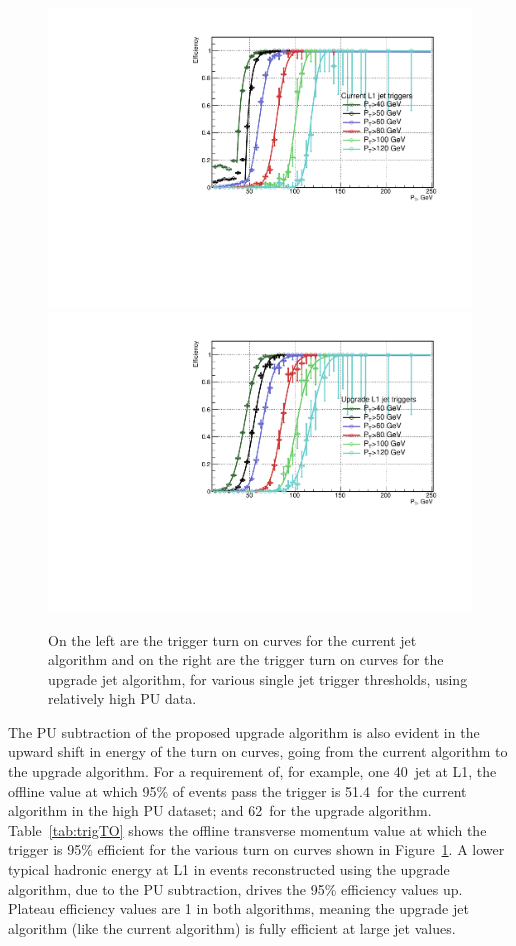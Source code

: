 \begin{figure}[t!]
\begin{center}
  \includegraphics[scale=0.37]{Figures/l1jets//CurrentL1JetTriggersHPU.pdf}
    \includegraphics[scale=0.37]{Figures/l1jets//UpgradeL1JetTriggersHPU.pdf}
\caption{On the left are the trigger turn on curves for the current jet algorithm and on the right are the trigger turn on curves for the upgrade jet algorithm, for various single jet trigger thresholds, using relatively high \ac{PU} data.}
\label{JetTO_highPU}
\end{center}
\end{figure}

The \ac{PU} subtraction of the proposed upgrade algorithm is also evident in the upward shift in energy of the turn on curves, going from the current algorithm to the upgrade algorithm. 
For a requirement of, for example, one 40~\GeV jet at \ac{L1}, the offline value at which 95\% of events pass the 
trigger is 51.4~\GeV for the current algorithm in the high \ac{PU} dataset; and 62~\GeV for the upgrade algorithm.
Table~\ref{tab:trigTO} shows the offline transverse momentum value at which the trigger is 95\% efficient for the various turn on curves shown in Figure~\ref{JetTO_highPU}.
A lower typical hadronic energy at \ac{L1} in events reconstructed using the upgrade algorithm, 
due to the \ac{PU} subtraction, drives the 95\% efficiency values up.
Plateau efficiency values are 1 in both algorithms, meaning the upgrade jet algorithm (like the current algorithm) is fully efficient at large jet \pt values.

